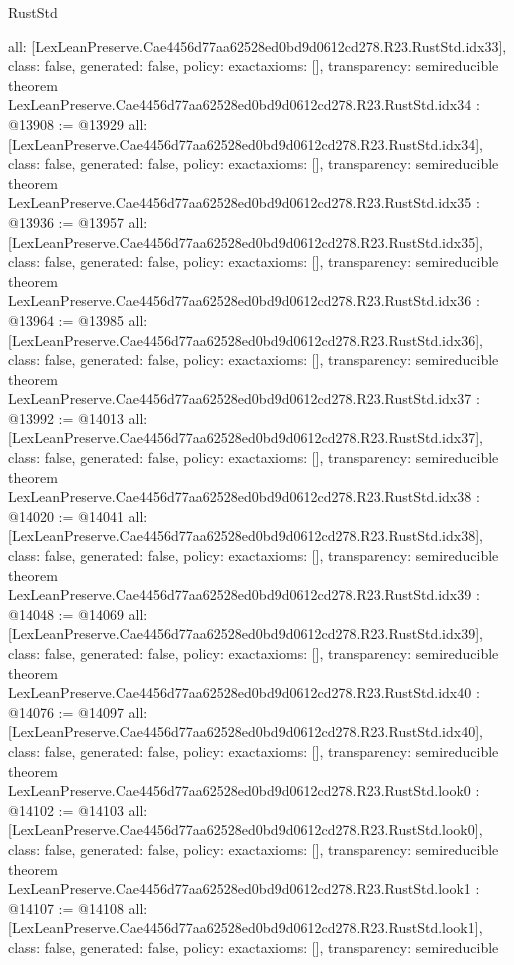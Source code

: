 \begin{lexlean}{RustStd}
\begin{coremodule}
{  all: [LexLeanPreserve.Cae4456d77aa62528ed0bd9d0612cd278.R23.RustStd.idx33],
  class: false,
  generated: false,
  policy: exact{axioms: []},
  transparency: semireducible
}
theorem LexLeanPreserve.Cae4456d77aa62528ed0bd9d0612cd278.R23.RustStd.idx34 : @13908 := @13929 {
  all: [LexLeanPreserve.Cae4456d77aa62528ed0bd9d0612cd278.R23.RustStd.idx34],
  class: false,
  generated: false,
  policy: exact{axioms: []},
  transparency: semireducible
}
theorem LexLeanPreserve.Cae4456d77aa62528ed0bd9d0612cd278.R23.RustStd.idx35 : @13936 := @13957 {
  all: [LexLeanPreserve.Cae4456d77aa62528ed0bd9d0612cd278.R23.RustStd.idx35],
  class: false,
  generated: false,
  policy: exact{axioms: []},
  transparency: semireducible
}
theorem LexLeanPreserve.Cae4456d77aa62528ed0bd9d0612cd278.R23.RustStd.idx36 : @13964 := @13985 {
  all: [LexLeanPreserve.Cae4456d77aa62528ed0bd9d0612cd278.R23.RustStd.idx36],
  class: false,
  generated: false,
  policy: exact{axioms: []},
  transparency: semireducible
}
theorem LexLeanPreserve.Cae4456d77aa62528ed0bd9d0612cd278.R23.RustStd.idx37 : @13992 := @14013 {
  all: [LexLeanPreserve.Cae4456d77aa62528ed0bd9d0612cd278.R23.RustStd.idx37],
  class: false,
  generated: false,
  policy: exact{axioms: []},
  transparency: semireducible
}
theorem LexLeanPreserve.Cae4456d77aa62528ed0bd9d0612cd278.R23.RustStd.idx38 : @14020 := @14041 {
  all: [LexLeanPreserve.Cae4456d77aa62528ed0bd9d0612cd278.R23.RustStd.idx38],
  class: false,
  generated: false,
  policy: exact{axioms: []},
  transparency: semireducible
}
theorem LexLeanPreserve.Cae4456d77aa62528ed0bd9d0612cd278.R23.RustStd.idx39 : @14048 := @14069 {
  all: [LexLeanPreserve.Cae4456d77aa62528ed0bd9d0612cd278.R23.RustStd.idx39],
  class: false,
  generated: false,
  policy: exact{axioms: []},
  transparency: semireducible
}
theorem LexLeanPreserve.Cae4456d77aa62528ed0bd9d0612cd278.R23.RustStd.idx40 : @14076 := @14097 {
  all: [LexLeanPreserve.Cae4456d77aa62528ed0bd9d0612cd278.R23.RustStd.idx40],
  class: false,
  generated: false,
  policy: exact{axioms: []},
  transparency: semireducible
}
theorem LexLeanPreserve.Cae4456d77aa62528ed0bd9d0612cd278.R23.RustStd.look0 : @14102 := @14103 {
  all: [LexLeanPreserve.Cae4456d77aa62528ed0bd9d0612cd278.R23.RustStd.look0],
  class: false,
  generated: false,
  policy: exact{axioms: []},
  transparency: semireducible
}
theorem LexLeanPreserve.Cae4456d77aa62528ed0bd9d0612cd278.R23.RustStd.look1 : @14107 := @14108 {
  all: [LexLeanPreserve.Cae4456d77aa62528ed0bd9d0612cd278.R23.RustStd.look1],
  class: false,
  generated: false,
  policy: exact{axioms: []},
  transparency: semireducible
}
\end{coremodule}
\end{lexlean}
